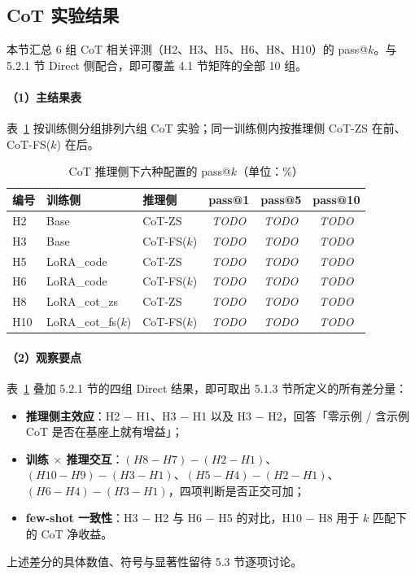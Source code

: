 \subsection{CoT 实验结果}

本节汇总 6 组 CoT 相关评测（H2、H3、H5、H6、H8、H10）的 pass@$k$。与 5.2.1 节 Direct 侧配合，即可覆盖 4.1 节矩阵的全部 10 组。

\paragraph{（1）主结果表}
表~\ref{tab:ch5-cot} 按训练侧分组排列六组 CoT 实验；同一训练侧内按推理侧 CoT-ZS 在前、CoT-FS($k$) 在后。

\begin{table}[!htb]
  \centering
  \caption{CoT 推理侧下六种配置的 pass@$k$（单位：\%）}
  \label{tab:ch5-cot}
  \footnotesize
  \begin{tabular}{lllccc}
    \toprule
    编号 & 训练侧 & 推理侧 & pass@1 & pass@5 & pass@10 \\
    \midrule
    H2  & Base               & CoT-ZS      & \textit{TODO} & \textit{TODO} & \textit{TODO} \\
    H3  & Base               & CoT-FS($k$) & \textit{TODO} & \textit{TODO} & \textit{TODO} \\
    \midrule
    H5  & LoRA\_code         & CoT-ZS      & \textit{TODO} & \textit{TODO} & \textit{TODO} \\
    H6  & LoRA\_code         & CoT-FS($k$) & \textit{TODO} & \textit{TODO} & \textit{TODO} \\
    \midrule
    H8  & LoRA\_cot\_zs      & CoT-ZS      & \textit{TODO} & \textit{TODO} & \textit{TODO} \\
    H10 & LoRA\_cot\_fs($k$) & CoT-FS($k$) & \textit{TODO} & \textit{TODO} & \textit{TODO} \\
    \bottomrule
  \end{tabular}
\end{table}


\paragraph{（2）观察要点}
表~\ref{tab:ch5-cot} 叠加 5.2.1 节的四组 Direct 结果，即可取出 5.1.3 节所定义的所有差分量：
\begin{itemize}
    \item \textbf{推理侧主效应}：H2 − H1、H3 − H1 以及 H3 − H2，回答「零示例 / 含示例 CoT 是否在基座上就有增益」；
    \item \textbf{训练 $\times$ 推理交互}：$(H8 - H7) - (H2 - H1)$、$(H10 - H9) - (H3 - H1)$、$(H5 - H4) - (H2 - H1)$、$(H6 - H4) - (H3 - H1)$，四项判断是否正交可加；
    \item \textbf{few-shot 一致性}：H3 − H2 与 H6 − H5 的对比，H10 − H8 用于 $k$ 匹配下的 CoT 净收益。
\end{itemize}
上述差分的具体数值、符号与显著性留待 5.3 节逐项讨论。

